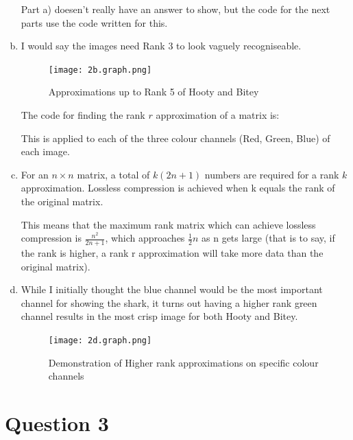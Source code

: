\documentclass[11pt]{article}
\begin{document}
\begin{enumerate}[a)]
Part a) doesen't really have an answer to show, but the code for the next parts use the code written for this.
\item
I would say the images need Rank 3 to look vaguely recogniseable.
\begin{figure}[H]
\centering
\texttt{[image: 2b.graph.png]}
\caption{Approximations up to Rank 5 of Hooty and Bitey}
\end{figure}
The code for finding the rank $r$ approximation of a matrix is:

This is applied to each of the three colour channels (Red, Green, Blue) of each image.
\item
For an $n \times n$ matrix, a total of $k(2n + 1)$ numbers are required for a rank $k$ approximation.
Lossless compression is achieved when k equals the rank of the original matrix.

This means that the maximum rank matrix which can achieve lossless compression is $\frac{n^2}{2n+1}$, which approaches $\frac{1}{2}n$ as n gets large (that is to say, if the rank is higher, a rank r approximation will take more data than the original matrix).

\item While I initially thought the blue channel would be the most important channel for showing the shark, it turns out having a higher rank green channel results in the most crisp image for both Hooty and Bitey.
\begin{figure}[h!]
\centering
\texttt{[image: 2d.graph.png]}
\caption{Demonstration of Higher rank approximations on specific colour channels}
\end{figure}
\end{enumerate}
\section*{Question 3}
\end{document}
